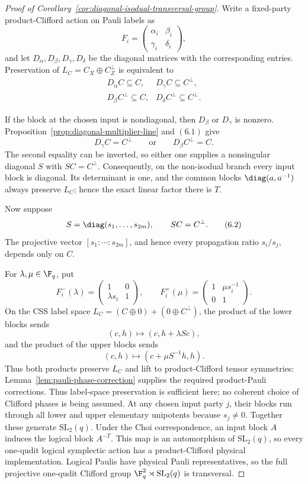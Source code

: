 \begin{proof}[Proof of
Corollary~\ref{cor:diagonal-isodual-transversal-group}]
Write a fixed-party product-Clifford action on Pauli labels as
\[
 F_i=\begin{pmatrix}\alpha_i&\beta_i\\
                     \gamma_i&\delta_i\end{pmatrix},
\]
and let \(D_\alpha,D_\beta,D_\gamma,D_\delta\) be the diagonal
matrices with the corresponding entries.  Preservation of
\(L_C=C_X\oplus C^\perp_Z\) is equivalent to
\[
\begin{array}{ll}
D_\alpha C\subseteq C,&D_\gamma C\subseteq C^\perp,\\
D_\beta C^\perp\subseteq C,&D_\delta C^\perp\subseteq C^\perp.
\end{array}                                             \tag{6.1}
\]

If the block at the chosen input is nondiagonal, then \(D_\beta\) or
\(D_\gamma\) is nonzero.
Proposition~\ref{prop:diagonal-multiplier-line} and \((6.1)\) give
\[
 D_\gamma C=C^\perp\qquad\text{or}\qquad
 D_\beta C^\perp=C.
\]
The second equality can be inverted, so either one supplies a
nonsingular diagonal \(S\) with \(SC=C^\perp\).  Consequently, on the
non-isodual branch every input block is diagonal.  Its determinant is
one, and the common blocks \(\diag(a,a^{-1})\) always preserve \(L_C\);
hence the exact linear factor there is \(T\).

Now suppose
\[
 S=\diag(s_1,\ldots,s_{2m}),\qquad SC=C^\perp .          \tag{6.2}
\]
The projective vector \([s_1:\cdots:s_{2m}]\), and hence every propagation
ratio \(s_i/s_j\), depends only on \(C\).

For \(\lambda,\mu\in\F_q\), put
\[
 F_i^-(\lambda)=
 \begin{pmatrix}1&0\\ \lambda s_i&1\end{pmatrix},
 \qquad
 F_i^+(\mu)=
 \begin{pmatrix}1&\mu s_i^{-1}\\0&1\end{pmatrix}.       \tag{6.3}
\]
On the CSS label space
\(L_C=(C\oplus0)+(0\oplus C^\perp)\), the product of the lower blocks
sends
\[
 (c,h)\longmapsto(c,h+\lambda Sc),
\]
and the product of the upper blocks sends
\[
 (c,h)\longmapsto(c+\mu S^{-1}h,h).
\]
Thus both products preserve \(L_C\) and lift to product-Clifford tensor
symmetries: Lemma~\ref{lem:pauli-phase-correction} supplies the required
product-Pauli corrections.  Thus label-space preservation is sufficient
here; no coherent choice of Clifford phases is being assumed.
At any chosen input party \(j\), their blocks run through all lower and
upper elementary unipotents because \(s_j\ne0\).  Together these generate
\(\mathrm{SL}_2(q)\).  Under the Choi correspondence, an input block
\(A\) induces the logical block \(A^{-T}\).  This map is an automorphism
of \(\mathrm{SL}_2(q)\), so every one-qudit logical symplectic action has
a product-Clifford physical implementation.  Logical Paulis have
physical Pauli representatives, so the full projective one-qudit
Clifford group
\(\F_q^2\rtimes\mathrm{SL}_2(q)\) is transversal.


\end{proof}
